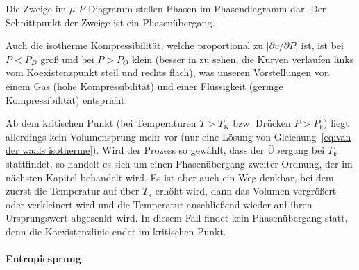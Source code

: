 Die Zweige im $\mu$-$P$-Diagramm stellen Phasen im Phasendiagramm dar. Der Schnittpunkt der Zweige ist ein Phasenübergang.

Auch die isotherme Kompressibilität, welche proportional zu $|\partial v/\partial P|$ ist, ist bei $P<P_D$ groß und bei $P>P_O$ klein (besser in  zu sehen, die Kurven verlaufen links vom Koexistenzpunkt steil und rechts flach), was unseren Vorstellungen von einem Gas (hohe Kompressibilität) und einer Flüssigkeit (geringe Kompressibilität) entspricht.


Ab dem kritischen Punkt (bei Temperaturen $T>T_\mathrm{K}$ bzw. Drücken $P>P_\mathrm{k}$) liegt allerdings kein Volumensprung mehr vor (nur eine Lösung von Gleichung~\eqref{eq:van der waals isotherme}). Wird der Prozess so gewählt, dass der Übergang bei $T_\mathrm{k}$ stattfindet, so handelt es sich um einen Phasenübergang zweiter Ordnung, der im nächsten Kapitel behandelt wird. Es ist aber auch ein Weg denkbar, bei dem zuerst die Temperatur auf über $T_\mathrm{k}$ erhöht wird, dann das Volumen vergrößert oder verkleinert wird und die Temperatur anschließend wieder auf ihren Ursprungswert abgesenkt wird. In diesem Fall findet kein Phasenübergang statt, denn die Koexistenzlinie endet im kritischen Punkt.


\paragraph*{Entropiesprung}

